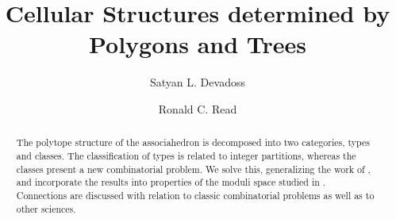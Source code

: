 \documentclass[10pt]{amsart}
\begin{document}
\newcommand{\con} {{\rm config}}
\newcommand{\Con} {{\rm Config}}
\newcommand{\Hu} {{\mathcal H}}                            \newcommand{\ba}{{\mathfrak b}}                            \newcommand{\sba}{{\mathfrak {sb}}}                        \newcommand{\pba}{{\mathfrak {pb}}}                        \newcommand{\D} {{\mathfrak D}}                            \newcommand{\B} {{\bf B}}                                  \newcommand{\Sh} {{\mathcal{S}}}                           \newcommand{\Pb} {{\bf P}}                                 \newcommand{\C} {{\mathbb C}}                              \newcommand{\R} {{\mathbb R}}                              \newcommand{\Z} {{\mathbb Z}}                              \newcommand{\N} {{\mathbb N}}                              \newcommand{\Pj} {{\mathbb P}}                             \newcommand{\T} {{\mathbb T}}                              \newcommand{\Sg} {\mathbb S}                               \newcommand{\sg} {\sigma}                                  \newcommand{\Gl} {{\rm Gl}}                                \newcommand{\G} {{\mathcal G}}                             \newcommand{\IG} {{\mathfrak S}}                           \newcommand{\trh} {\kappa}                                 \newcommand{\SI} {\ensuremath{SI}}                         \newcommand{\la}{{\langle}}                                \newcommand{\ra}{{\rangle}}                                
\theoremstyle{plain}
\newtheorem{thm}{Theorem}[subsection]
\newtheorem{prop}[thm]{Proposition}
\newtheorem{cor}[thm]{Corollary}
\newtheorem{lem}[thm]{Lemma}
\newtheorem{conj}[thm]{Conjecture}

\theoremstyle{definition}
\newtheorem{defn}[thm]{Definition}
\newtheorem{exmp}[thm]{Example}

\theoremstyle{remark}
\newtheorem*{rem}{Remark}
\newtheorem*{hnote}{Historical Note}
\newtheorem*{nota}{Notation}
\newtheorem*{ack}{Acknowledgments}


\title {Cellular Structures determined by Polygons and Trees}

\author{Satyan L. Devadoss}
\author{Ronald C. Read}

\address{Department of Mathematics, Ohio State University, Columbus, Ohio}
\address{Department of Combinatorics and Optimization, University of Waterloo, Canada}

\begin{abstract}
The polytope structure of the associahedron is decomposed into two categories, types and classes.  The classification of types is related to integer partitions, whereas the classes present a new combinatorial problem.  We solve this, generalizing the work of \cite{r1}, and incorporate the results into properties of the moduli space  studied in \cite{dev}.  Connections are discussed with relation to classic combinatorial problems as well as to other sciences.
\end{abstract}
\end{document}
